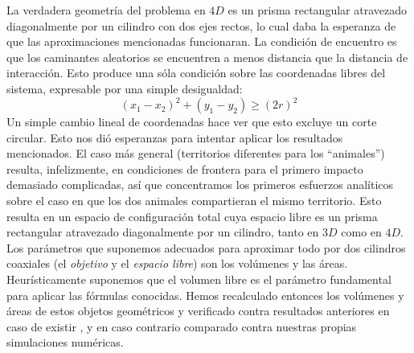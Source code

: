\documentclass[letterpaperr,12pt]{article}
\begin{document}
La verdadera geometría del problema en $4D$ es un prisma rectangular
atravezado diagonalmente por un cilindro con dos ejes rectos,
lo cual daba la esperanza de que las aproximaciones mencionadas
funcionaran. La condición de encuentro es que los caminantes aleatorios
se encuentren a menos distancia que la distancia de interacción. Esto
produce una sóla condición sobre las coordenadas libres del sistema, 
expresable por una simple desigualdad:
\begin{equation}
(x_1-x_2)^2+(y_1-y_2)\ge (2r)^2
\end{equation}
Un simple cambio lineal de coordenadas hace ver que
esto excluye un corte circular. Esto nos dió esperanzas para
intentar aplicar los resultados mencionados. El caso más general
(territorios diferentes para los ``animales'') resulta,
infelizmente, en condiciones de frontera para el primero
impacto demasiado complicadas, así que concentramos los primeros
esfuerzos analíticos sobre el caso en que los
dos animales compartieran el mismo territorio. 
Esto resulta en un espacio de configuración total cuya espacio
libre es un prisma rectangular atravezado diagonalmente
por un cilindro, tanto en $3D$ como en $4D$. Los parámetros
que suponemos adecuados para aproximar todo por dos
cilindros coaxiales (el \emph{objetivo} y el \emph{espacio libre})
son los volúmenes y las áreas. Heurísticamente suponemos que el 
volumen libre es el parámetro fundamental para aplicar 
las fórmulas conocidas. Hemos recalculado entonces
los volúmenes y áreas de estos objetos geométricos y verificado
contra resultados anteriores en caso de existir \cite{Munakata02},
y en caso contrario comparado contra nuestras propias 
simulaciones numéricas.
\end{document}

